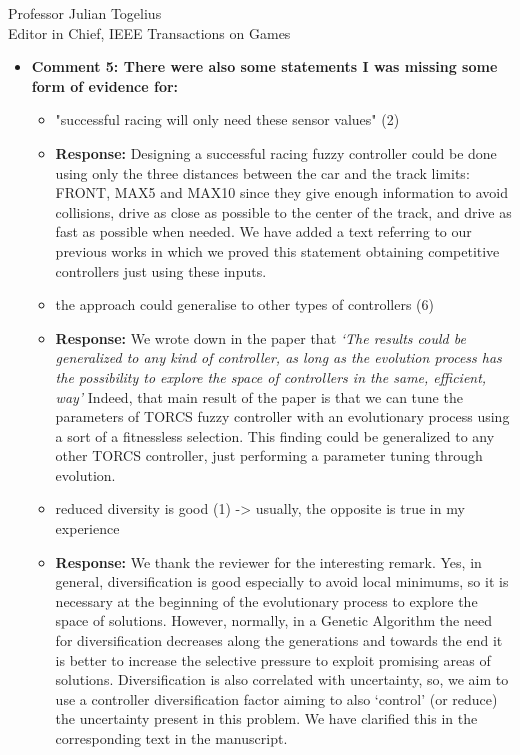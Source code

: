 \documentclass[10pt]{letter} %
\begin{document}
\begin{letter}{Professor Julian Togelius \\ Editor in Chief, IEEE Transactions on Games}
\begin{enumerate}
\begin{itemize}

		\item {\bf   Comment 5: There were also some statements I was missing some form of evidence for:}
			\begin{itemize}
			\item	"successful racing will only need these sensor values" (2)
					\item {\bf Response:} 
					Designing a successful racing fuzzy controller could be done using only the three distances  between the car and the track limits: FRONT, MAX5 and MAX10	since they give enough information to avoid collisions, drive as close as possible to the center of the track, and drive as fast as possible when needed. 
We have added a text referring to our previous works in which we proved this statement obtaining competitive controllers just using these inputs.\\
					
					
			\item	the approach could generalise to other types of controllers (6)
					\item {\bf Response:} 
					We wrote down in the paper that {\em `The results could be generalized to any kind of controller, as long as the evolution process has the possibility to explore the	space of controllers in the same, efficient, way'}
				Indeed, that main result of the paper is that we can tune the parameters of  TORCS fuzzy controller with an evolutionary process  using a sort of a fitnessless selection. This finding could be generalized to any other TORCS controller, just performing a parameter tuning through evolution.\\
				
			\item	reduced diversity is good (1) -> usually, the opposite is true in my experience
					\item {\bf Response:} 
			We thank the reviewer for the interesting remark.
			Yes, in general, diversification is good especially to avoid local minimums, so it is necessary at the beginning of the evolutionary process to explore the space of solutions. However, normally, in a Genetic Algorithm the need for diversification decreases along the generations and towards the end it is better to increase the selective pressure to exploit promising areas of solutions. Diversification is also correlated with uncertainty, so, we aim to use a controller diversification factor aiming to also `control' (or reduce) the uncertainty present in this problem.
We have clarified this in the corresponding text in the manuscript.
			\end{itemize}


\end{itemize}
\end{enumerate}
\end{letter}
\end{document}
